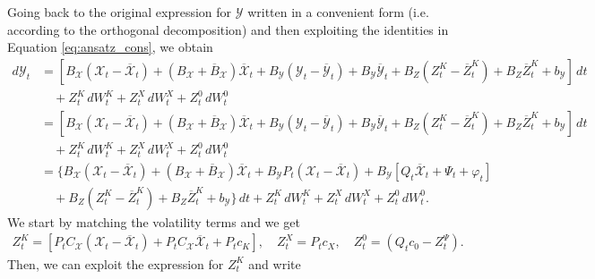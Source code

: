 \documentclass[11pt,twoside]{amsart}
\theoremstyle{definition}
\numberwithin{equation}{section}
\begin{document}
Going back to the original expression for $\mathcal{Y}$ written in a convenient form (i.e. according to the orthogonal decomposition) and then exploiting the identities in Equation \eqref{eq:ansatz_cons}, we obtain
\begin{align*}
    d{\mathcal{Y}}_t 
    & = [B_{\mathcal{X}} ({\mathcal{X}}_t - \overline{{\mathcal{X}}}_t) + (B_{\mathcal{X}}+\overline{B}_{\mathcal{X}}) \overline{{\mathcal{X}}}_t + B_{\mathcal{Y}} ({\mathcal{Y}}_t - \overline{\mathcal{Y}}_t) + B_{\mathcal{Y}}  \overline{\mathcal{Y}}_t + B_Z ({Z}^K_t-\overline{Z}^K_t) + B_Z \overline{Z}^K_t + b_\mathcal{Y}]\,dt \\
    & \quad + {Z}^K_t\,d{W}_t^{K} + {Z}^X_t\,dW_t^{X}+ {Z}^0_t\,dW_t^{0}\\
    & = [B_{\mathcal{X}} ({\mathcal{X}}_t - \overline{{\mathcal{X}}}_t) + (B_{\mathcal{X}}+\overline{B}_{\mathcal{X}}) \overline{{\mathcal{X}}}_t + B_{\mathcal{Y}} ({\mathcal{Y}}_t - \overline{\mathcal{Y}}_t) + B_{\mathcal{Y}}  \overline{\mathcal{Y}}_t + B_Z ({Z}^K_t-\overline{Z}^K_t) + B_Z \overline{Z}^K_t + b_\mathcal{Y}]\,dt \\
    & \quad + {Z}^K_t\,d{W}_t^{K} + {Z}^X_t\,dW_t^{X}+ {Z}^0_t\,dW_t^{0}\\
    & = \Big\{B_{\mathcal{X}} ({\mathcal{X}}_t - \overline{{\mathcal{X}}}_t) + (B_{\mathcal{X}}+\overline{B}_{\mathcal{X}}) \overline{{\mathcal{X}}}_t + B_{\mathcal{Y}} {P}_t({\mathcal{X}}_t - \overline{{\mathcal{X}}}_t) + B_{\mathcal{Y}}  [Q_t \overline{{\mathcal{X}}}_t + \Psi_t + \varphi_t] \\
    & \quad + B_Z ({Z}^K_t-\overline{Z}^K_t) + B_Z \overline{Z}^K_t + b_\mathcal{Y}\Big\}\,dt + {Z}^K_t\,d{W}_t^{K} + {Z}^X_t\,dW_t^{X}+ {Z}^0_t\,dW_t^{0}.
\end{align*}
We start by matching the volatility terms and we get
\begin{align}
    {Z}^K_t = \left[{P}_t C_{\mathcal{X}}({\mathcal{X}}_t - \overline{{\mathcal{X}}}_t) + {P}_t C_{\mathcal{X}} \overline{{\mathcal{X}}}_t +P_tc_K\right],
    \quad
    {Z}^X_t = P_tc_X,
    \quad
    {Z}^0_t = (Q_t c_{0}-Z^\Psi_t).
\end{align}
Then, we can exploit the expression for  ${Z}^K_t$ and write
\end{document}
